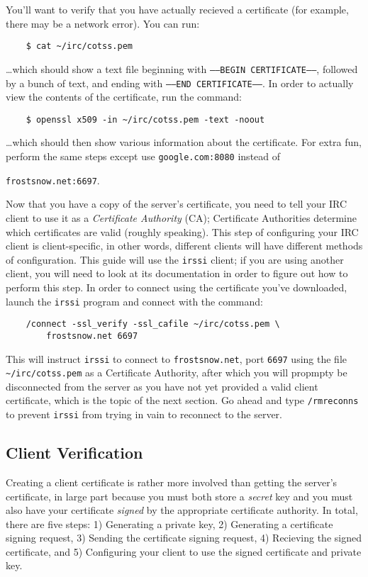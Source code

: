 \documentclass{article}
\begin{document}
You'll want to verify that you have actually recieved a certificate (for example, there may be a network error).  You can run:
\begin{lstlisting}
	$ cat ~/irc/cotss.pem
\end{lstlisting}
\ldots which should show a text file beginning with \texttt{-----BEGIN CERTIFICATE-----}, followed by a bunch of text, and ending with \texttt{-----END CERTIFICATE-----}.  In order to actually view the contents of the certificate, run the command:
\begin{lstlisting}
	$ openssl x509 -in ~/irc/cotss.pem -text -noout
\end{lstlisting}
\ldots which should then show various information about the certificate.  For extra fun, perform the same steps except use \texttt{google.com:8080} instead of {\texttt{frostsnow.net:6697}.

Now that you have a copy of the server's certificate, you need to tell your IRC client to use it as a \textit{Certificate Authority} (CA); Certificate Authorities determine which certificates are valid (roughly speaking).  This step of configuring your IRC client is client-specific, in other words, different clients will have different methods of configuration.  This guide will use the \texttt{irssi} client; if you are using another client, you will need to look at its documentation in order to figure out how to perform this step.  In order to connect using the certificate you've downloaded, launch the \texttt{irssi} program and connect with the command:
\begin{lstlisting}
    /connect -ssl_verify -ssl_cafile ~/irc/cotss.pem \
        frostsnow.net 6697
\end{lstlisting}
This will instruct \texttt{irssi} to connect to \texttt{frostsnow.net}, port \texttt{6697} using the file \texttt{\textasciitilde/irc/cotss.pem} as a Certificate Authority, after which you will propmpty be disconnected from the server as you have not yet provided a valid client certificate, which is the topic of the next section.  Go ahead and type \texttt{/rmreconns} to prevent \texttt{irssi} from trying in vain to reconnect to the server.

\subsection{Client Verification}
Creating a client certificate is rather more involved than getting the server's certificate, in large part because you must both store a \textit{secret} key and you must also have your certificate \textit{signed} by the appropriate certificate authority.  In total, there are five steps: 1) Generating a private key, 2) Generating a certificate signing request, 3) Sending the certificate signing request, 4) Recieving the signed certificate, and 5) Configuring your client to use the signed certificate and private key.

}
\end{document}
